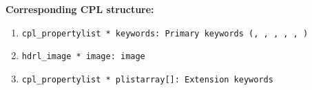 \begin{datastructdef}
\textbf{Corresponding \ac{CPL} structure:}
\begin{enumerate}
    \item \texttt{cpl\_propertylist * keywords: Primary keywords (\hyperref[fits:dpr.catg]{},  \hyperref[fits:dpr.tech]{},  \hyperref[fits:dpr.type]{},  \hyperref[fits:ins.opti3.name]{},  \hyperref[fits:ins.opti12.name]{}, \hyperref[fits:ins.opti13.name]{})}
    \item \texttt{hdrl\_image * image: image}
    \item \texttt{cpl\_propertylist * plistarray[]: Extension keywords}
\end{enumerate}
\end{datastructdef}



